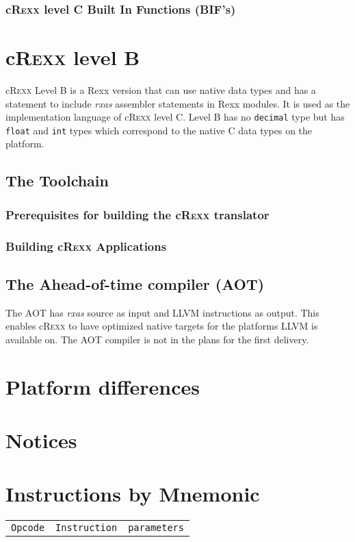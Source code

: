 \documentclass[english,11pt,twoside,toc=bib,toc=idx]{scrreprt}
\newcommand{\crexx}{c\textsc{Rexx}}
\newcommand{\keyword}[1]{\texttt{#1}}
\begin{document}
\subsection{\crexx{} level C Built In Functions (BIF's)}


\chapter{\crexx{} level B}
\crexx{} Level B is a Rexx version that can use native data types and
has a statement to include \emph{rxas} assembler statements in Rexx
modules. It is used as the implementation language of \crexx{} level
C. Level B has no \keyword{decimal} type but has \keyword{float} and
\keyword{int} types which correspond to the native C data types on the platform. 




\section{The Toolchain}
\subsection{Prerequisites for building the \crexx{} translator}
\subsection{Building \crexx{} Applications}

\section{The Ahead-of-time compiler (AOT)}
The AOT has \emph{rxas} source as input and LLVM instructions as
output. This enables \crexx{} to have optimized native targets for the
platforms LLVM is available on. The AOT compiler is not in the plans
for the first delivery.

\appendix
\chapter{Platform differences}

\chapter{Notices}

\chapter{Instructions by Mnemonic}
\begin{longtable}{lll}
  \toprule
  \texttt{Opcode} & \texttt{Instruction} & \texttt{parameters} \\
  
\end{longtable}
\end{document}
